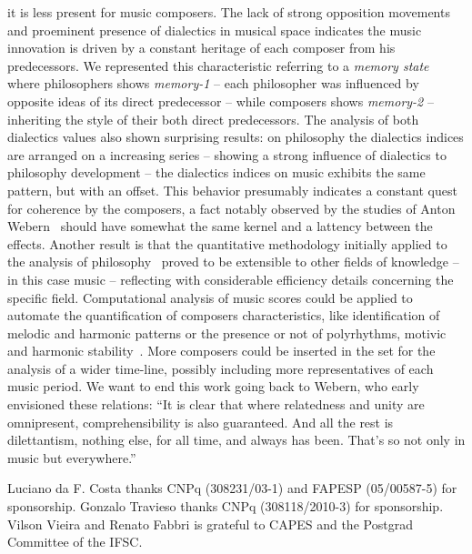 \documentclass[
 aip,
 jmp,
 amsmath,amssymb,
 reprint,
]{revtex4-1}
\begin{document}
it is less present for music composers. The lack of strong
opposition movements and proeminent presence of dialectics in musical space indicates the music innovation is driven by
a constant heritage of each composer from his predecessors. We
represented this characteristic referring to a \textit{memory state}
where philosophers shows \textit{memory-1} -- each philosopher was
influenced by opposite ideas of its direct predecessor -- while
composers shows \textit{memory-2} -- inheriting the style of their
both direct predecessors.
The
analysis of both dialectics values also shown surprising
results: on philosophy the dialectics indices are arranged on a
increasing series -- showing a strong influence of
dialectics to philosophy development -- the dialectics indices on
music exhibits the same pattern, but with an offset. This behavior presumably indicates a
constant quest for coherence by the composers, a fact notably observed by
the studies of Anton Webern~\cite{Webern} should have somewhat the same
kernel and a lattency between the effects.
Another result is that the quantitative methodology initially applied to the analysis of philosophy~\cite{Fabbri}
proved to be extensible to other fields of knowledge -- in this case music --
reflecting with considerable efficiency details concerning the specific field. 
Computational analysis of music scores could be
applied to automate the quantification of composers characteristics, like
identification of melodic and harmonic patterns or the presence or not of
polyrhythms, motivic and harmonic stability~\cite{Correa}. More composers could be
inserted in the set for the analysis of a wider time-line, possibly
including more representatives of each music period.
We want to end this work going back to Webern,
who early envisioned these relations: ``It is clear that where relatedness and unity are omnipresent,
comprehensibility is also guaranteed. And all the rest is
dilettantism, nothing else, for all time, and always has been. That's
so not only in music but everywhere.''
\begin{acknowledgments}
Luciano da F. Costa thanks CNPq (308231/03-1) and FAPESP (05/00587-5)
for sponsorship. Gonzalo Travieso thanks CNPq (308118/2010-3) for sponsorship. 
Vilson Vieira and Renato Fabbri is grateful to CAPES and 
the Postgrad Committee of the IFSC.
\end{acknowledgments}
\end{document}
